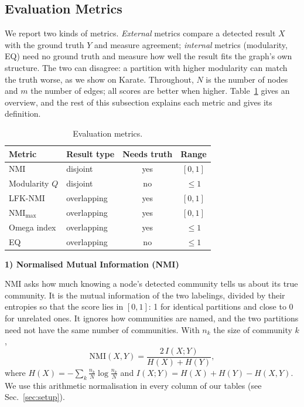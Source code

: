 \documentclass[conference]{IEEEtran}
\newcommand{\metrichead}[1]{\par\smallskip\noindent\textbf{#1}\par\nobreak\vspace{1pt}}
\begin{document}
\subsection{Evaluation Metrics}\label{sec:metrics}
We report two kinds of metrics. \emph{External} metrics compare a detected result $X$ with the ground truth $Y$ and measure agreement; \emph{internal} metrics (modularity, EQ) need no ground truth and measure how well the result fits the graph's own structure. The two can disagree: a partition with higher modularity can match the truth worse, as we show on Karate. Throughout, $N$ is the number of nodes and $m$ the number of edges; all scores are better when higher. Table~\ref{tab:metrics} gives an overview, and the rest of this subsection explains each metric and gives its definition.
\begin{table}[H]
\centering
\caption{Evaluation metrics.}
\label{tab:metrics}
\scriptsize
\setlength{\tabcolsep}{3pt}
\begin{tabular}{llcc}
\toprule
Metric & Result type & Needs truth & Range \\
\midrule
NMI & disjoint & yes & $[0,1]$ \\
Modularity $Q$ & disjoint & no & $\le 1$ \\
LFK-NMI & overlapping & yes & $[0,1]$ \\
$\mathrm{NMI}_{\max}$ & overlapping & yes & $[0,1]$ \\
Omega index & overlapping & yes & $\le 1$ \\
EQ & overlapping & no & $\le 1$ \\
\bottomrule
\end{tabular}
\end{table}

\metrichead{1) Normalised Mutual Information (NMI)}
NMI asks how much knowing a node's detected community tells us about its true community. It is the mutual information of the two labelings, divided by their entropies so that the score lies in $[0,1]$: 1 for identical partitions and close to 0 for unrelated ones. It ignores how communities are named, and the two partitions need not have the same number of communities. With $n_k$ the size of community $k$,
\begin{equation}
\mathrm{NMI}(X,Y)=\frac{2\,I(X;Y)}{H(X)+H(Y)},\label{eq:nmi}
\end{equation}
where $H(X)=-\sum_k\frac{n_k}{N}\log\frac{n_k}{N}$ and $I(X;Y)=H(X)+H(Y)-H(X,Y)$. We use this arithmetic normalisation in every column of our tables (see Sec.~\ref{sec:setup}).
\end{document}
